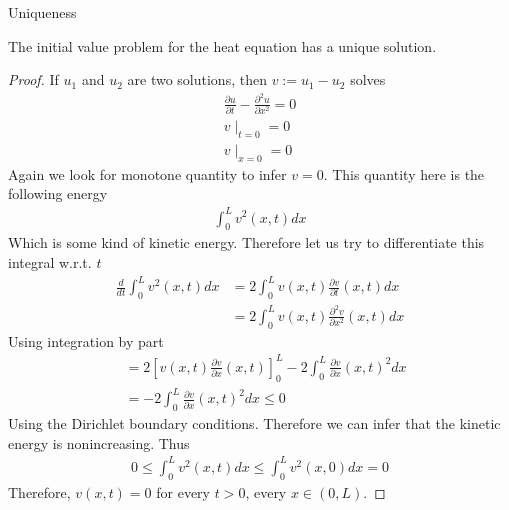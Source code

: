 \begin{parag}{Uniqueness}
    

\begin{theoreme}
The initial value problem for the heat equation has a unique solution.
\end{theoreme}


\begin{proof}
    If $u_1$ and $u_2$ are two solutions, then $v := u_1 - u_2$ solves
	\begin{align*} 
		\frac{\partial u}{\partial t} - \frac{\partial^2 u}{\partial x^2} = 0 \\
		v \mid_{t= 0} = 0\\
		v \mid_{x = 0}= 0
	\end{align*}
	Again we look for monotone quantity to infer $v= 0$. This quantity here is the following energy 
	\begin{align*} 
		\int_{0}^{L}v^2\left(x, t\right)dx
	\end{align*}
	Which is some kind of kinetic energy. Therefore let us try to differentiate this integral w.r.t. $t$
	\begin{align*} 
		\frac{d}{dt} \int_{0}^{L}v^2\left(x, t\right)dx &= 2 \int_{0}^{L}v\left(x, t\right)\frac{\partial v}{\partial t} \left(x, t\right) dx \\
		&= 2 \int_{0}^{L}v\left(x, t\right) \frac{\partial^2 v}{\partial x^2} \left(x, t\right)dx
	\end{align*}
	Using integration by part 
	\begin{align*} 
		&=  2\left[v\left(x, t\right)\frac{\partial v}{\partial x} \left(x, t\right)\right]_{0}^{L} - 2\int_{0}^{L}\frac{\partial v}{\partial x} \left(x, t\right)^2 dx\\
		&= -2 \int_{0}^{L}\frac{\partial v}{\partial x} \left(x, t\right)^2 dx \leq 0
	\end{align*}
	Using the Dirichlet boundary conditions. Therefore we can infer that the kinetic energy is nonincreasing. Thus 
	\begin{align*} 
		0 \leq \int_{0}^{L} v^2\left(x, t\right)dx \leq \int_{0}^{L}v^2 \left(x, 0\right) dx = 0
	\end{align*}
	Therefore, $v\left(x, t\right) = 0$ for every $t > 0$, every $x \in \left(0, L\right)$.

\end{proof}

\end{parag}
